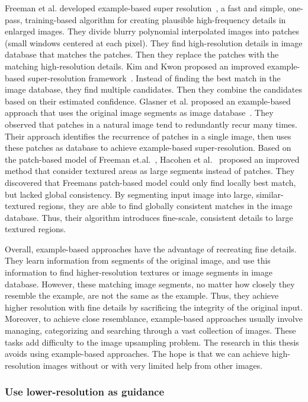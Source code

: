 Freeman et al. developed example-based super resolution~\cite{Freeman:pct}, a fast and simple, one-pass, training-based algorithm for creating plausible high-frequency details in enlarged images. They divide blurry polynomial interpolated images into patches (small windows centered at each pixel). They find high-resolution details in image database that matches the patches. Then they replace the patches with the matching high-resolution details. Kim and Kwon proposed an improved example-based super-resolution framework~\cite{Kim:singlImg}. Instead of finding the best match in the image database, they find multiple candidates. Then they combine the candidates based on their estimated confidence. Glasner et al. proposed an example-based approach that uses the original image segments as image database~\cite{Glasner:singlSup}. They observed that patches in a natural image tend to redundantly recur many times. Their approach identifies the recurrence of patches in a single image, then uses these patches as database to achieve example-based super-resolution. Based on the patch-based model of Freeman et.al.~\cite{Freeman:pct}, Hacohen et al.~\cite{Fattal:Hallucination} proposed an improved method that consider textured areas as large segments instead of patches. They discovered that Freeman\textquotesingle s patch-based model could only find locally best match, but lacked global consistency. By segmenting input image into large, similar-textured regions, they are able to find globally consistent matches in the image database. Thus, their algorithm introduces fine-scale, consistent details to large textured regions.

Overall, example-based approaches have the advantage of recreating fine details. They learn information from segments of the original image, and use this information to find higher-resolution textures or image segments in image database. However, these matching image segments, no matter how closely they resemble the example, are not the same as the example. Thus, they achieve higher resolution with fine details by sacrificing the integrity of the original input. Moreover, to achieve close resemblance, example-based approaches usually involve managing, categorizing and searching through a vast collection of images. These tasks add difficulty to the image upsampling problem. The research in this thesis avoids using example-based approaches. The hope is that we can achieve high-resolution images without or with very limited help from other images. 

\subsubsection{Use lower-resolution as guidance}\label{bg:otherApproaches}

